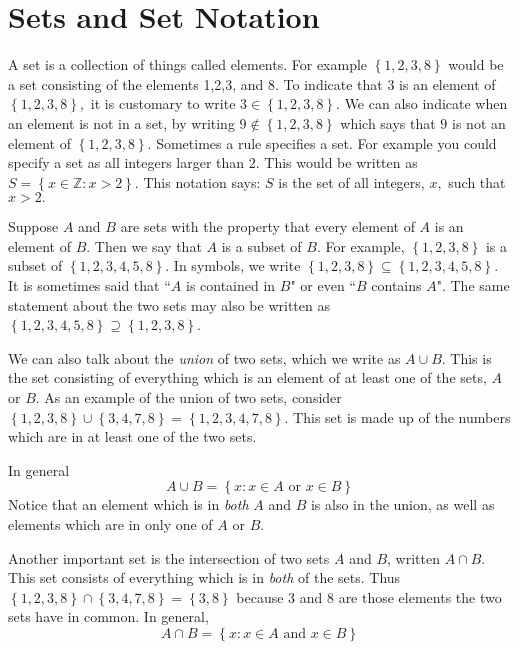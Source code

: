\section{Sets and Set Notation}

A set is a collection
 of things called elements.
For example $\left\{ 1,2,3,8\right\} $
would be a set consisting of the elements 1,2,3, and 8. To indicate that $3$
is an element of $\left\{ 1,2,3,8\right\} ,$ it is customary to write $3\in
\left\{ 1,2,3,8\right\} .$ We can also indicate when an element is not in a set, 
by writing $9\notin \left\{ 1,2,3,8\right\} $ which says that $9$ is
not an element of $\left\{ 1,2,3,8\right\} .$ Sometimes a rule specifies a
set. For example you could specify a set as all integers larger than $2.$
This would be written as $S=\left\{ x\in \mathbb{Z}:x>2\right\} .$ This
notation says: $S$ is the set of all integers, $x,$ such that $x>2.$

Suppose $A$ and $B$ are sets with the property that every element of $A$ is an
element of $B$. Then we say that $A$ is a subset of $B.$ For example, $\left\{
1,2,3,8\right\} $ is a subset of $\left\{ 1,2,3,4,5,8\right\}.$ In symbols, we write
$\left\{ 1,2,3,8\right\} \subseteq \left\{ 1,2,3,4,5,8\right\} .$ It is
sometimes said that ``$A$ is contained in $B$" or even ``$B$ contains $A$".
The same statement about the two sets may also be written as $\left\{
1,2,3,4,5,8\right\} \supseteq \left\{ 1,2,3,8\right\} $.

We can also talk about the {\em union\em} of two sets, which we write as $A \cup B$. This is the set consisting of everything which is an
element of at least one of the sets, $A$ or $B$. As an example of the union
of two sets, consider $\left\{ 1,2,3,8\right\} \cup \left\{ 3,4,7,8\right\} =\left\{
1,2,3,4,7,8\right\} $. This set is made up of the numbers which are in at least
one of the two sets.
\index{$\cup $}
\index{$\cap $} 

In general
\begin{equation*}
A\cup B = \left\{ x:x\in A
\text{ or }x\in B\right\} 
\end{equation*}
Notice that an element which is in {\em both\em} $A$ and $B$ is also in the
union, as well as elements which are in only one of $A$ or $B$. 

Another important set is the intersection  of two sets $A$ and $B$, written $A \cap B$. This set consists of everything which is in
{\em both\em} of the sets. Thus $\left\{ 1,2,3,8\right\} \cap \left\{ 3,4,7,8\right\}
=\left\{ 3,8\right\} $ because $3$ and $8$ are those elements the two sets
have in common. In general,
\begin{equation*}
A\cap B =  \left\{ x:x\in A\text{ and }x\in B\right\} 
\end{equation*}

